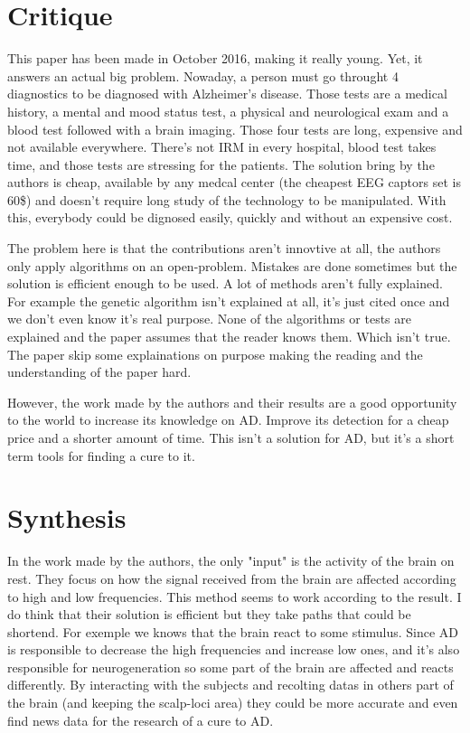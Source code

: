 \documentclass[a4paper, 12pt]{article}
\begin{document}
\section{Critique}
This paper has been made in October 2016, making it really young. Yet, it answers an actual big problem. Nowaday, a person must go throught 4 diagnostics to be diagnosed with Alzheimer's disease. Those tests are a medical history, a mental and mood status test, a physical and neurological exam and a blood test followed with a brain imaging. Those four tests are long, expensive and not available everywhere. There's not IRM in every hospital, blood test takes time, and those tests are stressing for the patients. The solution bring by the authors is cheap, available by any medcal center (the cheapest EEG captors set is 60\$) and doesn't require long study of the technology to be manipulated. With this, everybody could be dignosed easily, quickly and without an expensive cost. 

The problem here is that the contributions aren't innovtive at all, the authors only apply algorithms on an open-problem. Mistakes are done sometimes but the solution is efficient enough to be used. A lot of methods aren't fully explained. For example the genetic algorithm isn't explained at all, it's just cited once and we don't even know it's real purpose. None of the algorithms or tests are explained and the paper assumes that the reader knows them. Which isn't true. The paper skip some explainations on purpose making the reading and the understanding of the paper hard.

However, the work made by the authors and their results are a good opportunity to the world to increase its knowledge on AD. Improve its detection for a cheap price and a shorter amount of time. This isn't a solution for AD, but it's a short term tools for finding a cure to it.

\section{Synthesis}
In the work made by the authors, the only "input" is the activity of the brain on rest. They focus on how the signal received from the brain are affected according to high and low frequencies. This method seems to work according to the result. I do think that their solution is efficient but they take paths that could be shortend. For exemple we knows that the brain react to some stimulus. Since AD is responsible to decrease the high frequencies and increase low ones, and it's also responsible for neurogeneration so some part of the brain are affected and reacts differently. By interacting with the subjects and recolting datas in others part of the brain (and keeping the scalp-loci area) they could be more accurate and even find news data for the research of a cure to AD.
\end{document}
